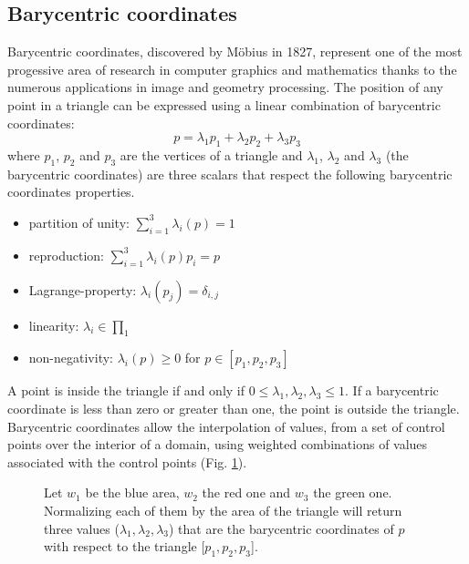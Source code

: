 \subsection{Barycentric coordinates}\label{section:barycentric-coord}
Barycentric coordinates, discovered by M\"obius in 1827, represent one of the most progessive area of research in computer graphics and mathematics thanks to the numerous applications in image and geometry processing.
\cite{REPORT:localbarycentricoordsepfl}
The position of any point in a triangle can be expressed using a linear combination of barycentric coordinates:
$$ p = \lambda_1 p_1 + \lambda_2 p_2 + \lambda_3 p_3$$
where $p_1$, $p_2$ and $p_3$ are the vertices of a triangle and $\lambda_1$, $\lambda_2$ and $\lambda_3$ (the barycentric coordinates) are three scalars that
respect the following barycentric coordinates properties.\cite{SLIDE:ICORSI}
\begin{itemize}
  \item partition of unity: $\sum_{i=1}^3 \lambda_{i}(p) = 1$
  \item reproduction: $\sum_{i=1}^3 \lambda_{i}(p)p_i = p$
  \item Lagrange-property: $\lambda_i(p_j) = \delta_{i, j}$
  \item linearity: $\lambda_i \in \prod_1$
  \item non-negativity: $\lambda_i(p)\geq 0$ for $p \in [p_1, p_2, p_3]$
\end{itemize}

A point is inside the triangle if and only if $0 \leq \lambda_1, \lambda_2, \lambda_3 \leq 1$. If a barycentric coordinate is less than zero or greater than one, the point is outside the triangle.
Barycentric coordinates allow the interpolation of values, from a set of control points over the interior of a domain, using weighted combinations of values associated with the control points (Fig. \ref{fig:barycentric-coord}).
\cite{REPORT:localbarycentricoordsepfl}
\begin{figure}[h!]
  \centering
    \caption{Let $w_1$ be the blue area, $w_2$ the red one and $w_3$ the green one. Normalizing each of them by the area of the triangle will return three values ($\lambda_1, \lambda_2, \lambda_3$) that are the barycentric coordinates of $p$ with respect to the triangle [$p_1, p_2, p_3$].}
    \label{fig:barycentric-coord}
  \end{figure}

